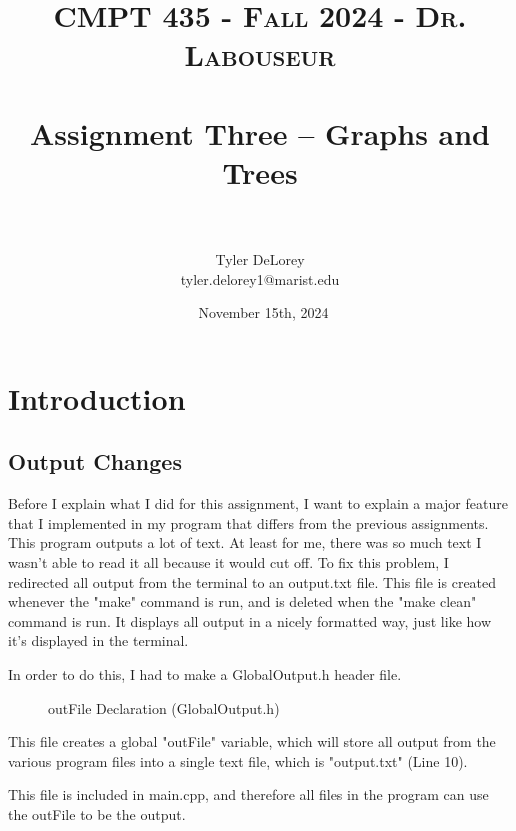 \documentclass[letterpaper, 10pt]{article}
\title{	
   \normalfont \normalsize 
   \textsc{CMPT 435 - Fall 2024 - Dr. Labouseur} \\[10pt] %
   \horrule{0.5pt} \\[0.25cm] 	%
   \huge Assignment Three -- Graphs and Trees \\     	    %
   \horrule{0.5pt} \\[-0.25cm] 	%
}
\author{Tyler DeLorey \\ \normalsize tyler.delorey1@marist.edu}
\date{\normalsize\ November 15th, 2024}
\begin{document}
 
\maketitle %


\renewcommand{\thefigure}{\thesection.\arabic{figure}}

\tableofcontents

\section{Introduction}
\subsection{Output Changes}

\noindent
Before I explain what I did for this assignment, I want to explain a major feature that I implemented in my program that differs from the previous assignments. This program outputs a lot of text. At least for me, there was so much text I wasn't able to read it all because it would cut off. To fix this problem, I redirected all output from the terminal to an output.txt file. This file is created whenever the "make" command is run, and is deleted when the "make clean" command is run. It displays all output in a nicely formatted way, just like how it's displayed in the terminal.

\vspace{1em}

\noindent
In order to do this, I had to make a GlobalOutput.h header file.

\begin{figure}[H]
  \centering
  
  \caption{outFile Declaration (GlobalOutput.h)}
  \label{fig:figure1.1}
\end{figure}

\noindent
This file creates a global "outFile" variable, which will store all output from the various program files into a single text file, which is "output.txt" (Line 10). 

\vspace{1em}

\noindent
This file is included in main.cpp, and therefore all files in the program can use the outFile to be the output.
\end{document}
